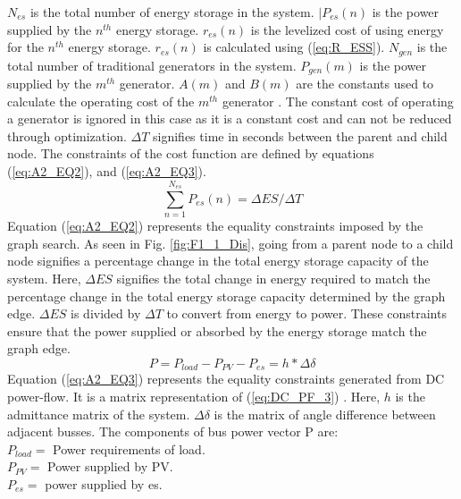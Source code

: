  $N_{es}$ is the total number of energy storage in the system. $|P_{es}(n)$ is the power supplied by the $n^{th}$ energy storage. $r_{es}(n)$ is the levelized cost of using energy for the $n^{th}$ energy storage. $r_{es}(n)$ is calculated using (\ref{eq:R_ESS}). $N_{gen}$ is the total number of traditional generators in the system. $P_{gen}(m)$ is the power supplied by the $m^{th}$ generator. $A(m)$ and $B(m)$ are the constants used to calculate the operating cost of the $m^{th}$ generator \cite{saadat1999power}. The constant cost of operating a generator is ignored in this case as it is a constant cost and can not be reduced through optimization. $\Delta T$ signifies time in seconds between the parent and child node. The constraints of the cost function are defined by equations (\ref{eq:A2_EQ2}), and (\ref{eq:A2_EQ3}).
\begin{equation}
\label{eq:A2_EQ2}
\sum_{n=1}^{N_{es}}P_{es}(n) = \Delta ES / \Delta T
\end{equation}
Equation (\ref{eq:A2_EQ2}) represents the equality constraints imposed by the graph search. As seen in Fig. \ref{fig:F1_1_Dis}, going from a parent node to a child node signifies a percentage change in the total energy storage capacity of the system. Here, $\Delta ES$ signifies the total change in energy required to match the percentage change in the total energy storage capacity determined by the graph edge. $\Delta ES$ is divided by $\Delta T$ to convert from energy to power. These constraints ensure that the power supplied or absorbed by the energy storage match the graph edge.
\begin{equation}
\label{eq:A2_EQ3}
P = P_{load} - P_{PV} - P_{es} = h*\Delta \delta 
\end{equation}
Equation (\ref{eq:A2_EQ3}) represents the equality constraints generated from DC power-flow. It is a matrix representation of (\ref{eq:DC_PF_3}) \cite{DC_PF1}. Here, $h$ is the admittance matrix of the system. $\Delta \delta$ is the matrix of angle difference between adjacent busses. The components of bus power vector P are:\\
$P_{load} =$ Power requirements of load.\\
$P_{PV} =$ Power supplied by PV.\\
$P_{es} =$ power supplied by es.\\


